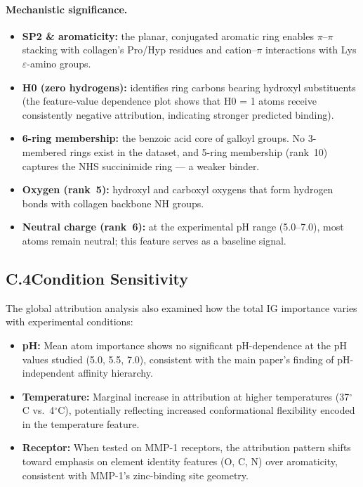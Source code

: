 \documentclass[11pt]{article}
\begin{document}
\paragraph{Mechanistic significance.}
\begin{itemize}[leftmargin=1.5em]
  \item \textbf{SP2 \& aromaticity:} the planar, conjugated aromatic ring
    enables $\pi$--$\pi$ stacking with collagen's Pro/Hyp residues and
    cation--$\pi$ interactions with Lys $\varepsilon$-amino groups.
  \item \textbf{H0 (zero hydrogens):} identifies ring carbons bearing
    hydroxyl substituents (the feature-value dependence plot shows
    that H0 = 1 atoms receive consistently negative attribution,
    indicating stronger predicted binding).
  \item \textbf{6-ring membership:} the benzoic acid core of galloyl
    groups. No 3-membered rings exist in the dataset, and 5-ring
    membership (rank~10) captures the NHS succinimide ring ---
    a weaker binder.
  \item \textbf{Oxygen (rank~5):} hydroxyl and carboxyl oxygens that
    form hydrogen bonds with collagen backbone NH groups.
  \item \textbf{Neutral charge (rank~6):} at the experimental pH range
    (5.0--7.0), most atoms remain neutral; this feature serves as a
    baseline signal.
\end{itemize}

\subsection*{C.4\quad Condition Sensitivity}

The global attribution analysis also examined how the total IG
importance varies with experimental conditions:
\begin{itemize}[leftmargin=1.5em]
  \item \textbf{pH:} Mean atom importance shows no significant
    pH-dependence at the pH values studied (5.0, 5.5, 7.0),
    consistent with the main paper's finding of pH-independent
    affinity hierarchy.
  \item \textbf{Temperature:} Marginal increase in attribution at
    higher temperatures (37$^\circ$C vs.\ 4$^\circ$C), potentially
    reflecting increased conformational flexibility encoded in
    the temperature feature.
  \item \textbf{Receptor:} When tested on MMP-1 receptors, the
    attribution pattern shifts toward emphasis on element identity
    features (O, C, N) over aromaticity, consistent with
    MMP-1's zinc-binding site geometry.
\end{itemize}
\end{document}
